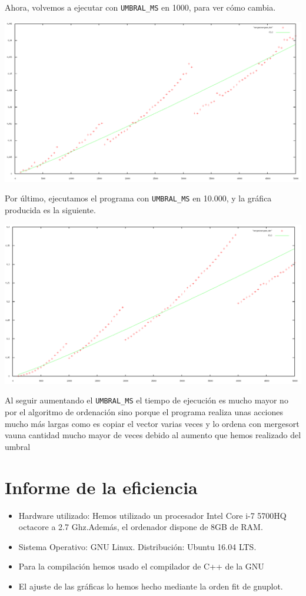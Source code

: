 \documentclass[11pt]{article}
\begin{document}
Ahora, volvemos a ejecutar con \verb~UMBRAL_MS~ en 1000, para ver cómo cambia.

\includegraphics[scale=0.25]{merge2.png}


Por último, ejecutamos el programa con \verb~UMBRAL_MS~ en 10.000, y la gráfica producida es la siguiente.

\includegraphics[scale=0.25]{merge3.png}

Al seguir aumentando el \verb~UMBRAL_MS~ el tiempo de ejecución es mucho mayor no por el algoritmo de ordenación
sino porque el programa realiza unas acciones mucho más largas como es copiar el vector varias veces y lo ordena
con mergesort vauna cantidad mucho mayor de veces debido al aumento que hemos realizado del umbral


\section*{Informe de la eficiencia}
\label{sec-9}

\begin{itemize}
\item Hardware utilizado: Hemos utilizado un procesador Intel Core i-7 5700HQ octacore a 2.7 Ghz.Además, el ordenador dispone de 8GB de RAM.
\item Sistema Operativo: GNU Linux. Distribución: Ubuntu 16.04 LTS.
\item Para la compilación hemos usado el compilador de C++ de la GNU
\item El ajuste de las gráficas lo hemos hecho mediante la orden fit de gnuplot.
\end{itemize}
\end{document}
